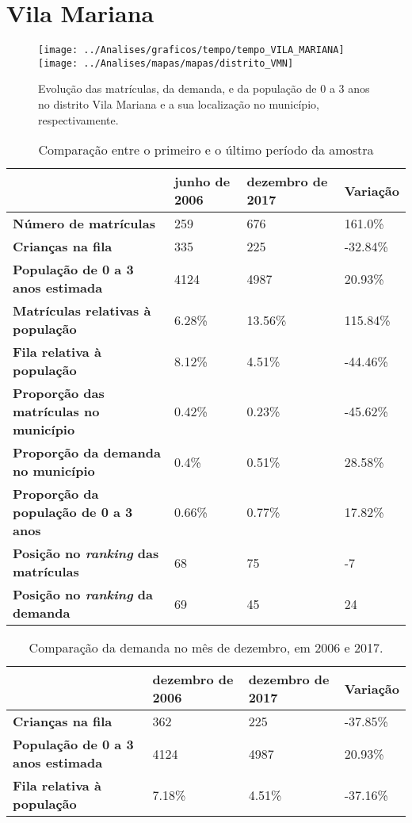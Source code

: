 \section{Vila Mariana}
\begin{figure}[H]
	\centering
	\texttt{[image: ../Analises/graficos/tempo/tempo\_VILA\_MARIANA]}
	\texttt{[image: ../Analises/mapas/mapas/distrito\_VMN]}
	\caption{Evolução das matrículas, da demanda, e da população de 0 a 3 anos no distrito Vila Mariana e a sua localização no município, respectivamente.}
\end{figure}
\begin{table}[H]
	\begin{tabular}{|l|l|l|l|}
		\hline
		\textbf{}                                      & \textbf{junho de 2006}       & \textbf{dezembro de 2017}    & \textbf{Variação} \\ \hline
		\textbf{Número de matrículas}                  & 259 & 676 & 161.0\% \\ \hline
		\textbf{Crianças na fila}                      & 335 & 225 & -32.84\% \\ \hline
		\textbf{População de 0 a 3 anos estimada}      & 4124 & 4987 & 20.93\% \\ \hline
		\textbf{Matrículas relativas à população}      & 6.28\% & 13.56\% & 115.84\% \\ \hline
		\textbf{Fila relativa à população}             & 8.12\% & 4.51\% & -44.46\% \\ \hline
		\textbf{Proporção das matrículas no município} & 0.42\% & 0.23\% & -45.62\% \\ \hline
		\textbf{Proporção da demanda no município}     & 0.4\% & 0.51\% & 28.58\% \\ \hline
		\textbf{Proporção da população de 0 a 3 anos}  & 0.66\% & 0.77\% & 17.82\% \\ \hline
		\textbf{Posição no \textit{ranking} das matrículas}     & 68 & 75 & -7 \\ \hline
		\textbf{Posição no \textit{ranking} da demanda}         & 69 & 45 & 24 \\ \hline
	\end{tabular}
	\caption{Comparação entre o primeiro e o último período da amostra}
\end{table}
\begin{table}[H]
	\begin{tabular}{|l|l|l|l|}
		\hline
		\textbf{}                                 & \textbf{dezembro de 2006} & \textbf{dezembro de 2017} & \textbf{Variação} \\ \hline
		\textbf{Crianças na fila}                      & 362 & 225 & -37.85\% \\ \hline
		\textbf{População de 0 a 3 anos estimada}      & 4124 & 4987 & 20.93\% \\ \hline
		\textbf{Fila relativa à população}             & 7.18\% & 4.51\% & -37.16\% \\ \hline
	\end{tabular}
	\caption{Comparação da demanda no mês de dezembro, em 2006 e 2017.}
\end{table}
